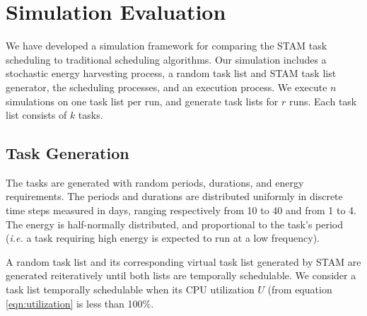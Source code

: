 \section{Simulation Evaluation} \label{sec:simulation}

We have developed a simulation framework for comparing the \textsc{STAM} task scheduling to traditional scheduling algorithms.  Our simulation includes a stochastic energy harvesting process, a random task list and \textsc{STAM} task list generator, the scheduling processes, and an execution process.  We execute $n$ simulations on one task list per run, and generate task lists for $r$ runs.  Each task list consists of $k$ tasks.

\subsection{Task Generation}
The tasks are generated with random periods, durations, and energy requirements.  The periods and durations are distributed uniformly in discrete time steps measured in days, ranging respectively from 10 to 40 and from 1 to 4.  The energy is half-normally distributed, and proportional to the task's period (\emph{i.e.} a task requiring high energy is expected to run at a low frequency).

A random task list and its corresponding virtual task list generated by \textsc{STAM} are generated reiteratively until both lists are temporally schedulable.  We consider a task list temporally schedulable when its CPU utilization $U$ (from equation \ref{eqn:utilization} is less than 100\%.

